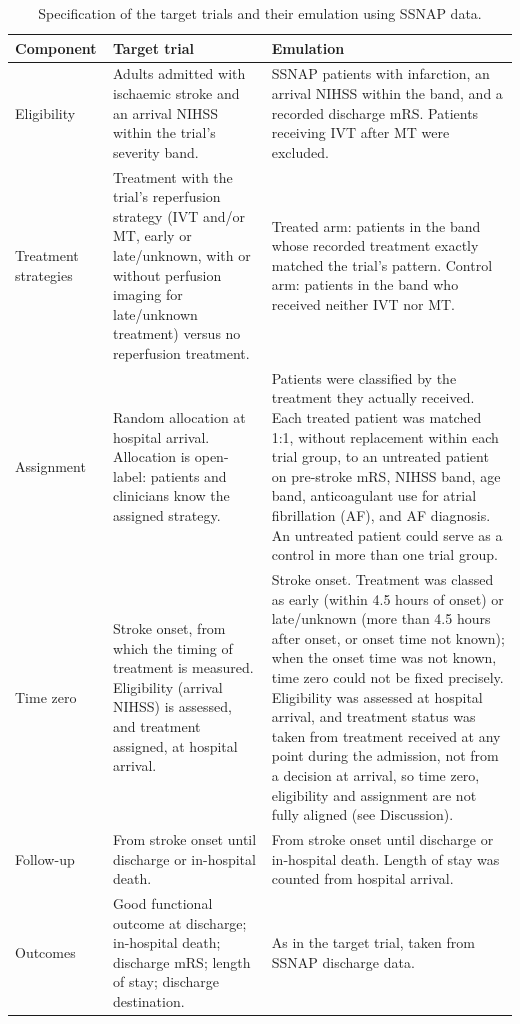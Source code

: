 \begin{table}[H]
\centering
\small
\caption{Specification of the target trials and their emulation using SSNAP data.}
\label{tab:target_trial}
\begin{tabular}{p{2.8cm} p{6.6cm} p{6.6cm}}
\toprule
\textbf{Component} & \textbf{Target trial} & \textbf{Emulation} \\
\midrule
Eligibility & Adults admitted with ischaemic stroke and an arrival NIHSS within the trial's severity band. & SSNAP patients with infarction, an arrival NIHSS within the band, and a recorded discharge mRS. Patients receiving IVT after MT were excluded. \\
\addlinespace
Treatment strategies & Treatment with the trial's reperfusion strategy (IVT and/or MT, early or late/unknown, with or without perfusion imaging for late/unknown treatment) versus no reperfusion treatment. & Treated arm: patients in the band whose recorded treatment exactly matched the trial's pattern. Control arm: patients in the band who received neither IVT nor MT. \\
\addlinespace
Assignment & Random allocation at hospital arrival. Allocation is open-label: patients and clinicians know the assigned strategy. & Patients were classified by the treatment they actually received. Each treated patient was matched 1:1, without replacement within each trial group, to an untreated patient on pre-stroke mRS, NIHSS band, age band, anticoagulant use for atrial fibrillation (AF), and AF diagnosis. An untreated patient could serve as a control in more than one trial group. \\
\addlinespace
Time zero & Stroke onset, from which the timing of treatment is measured. Eligibility (arrival NIHSS) is assessed, and treatment assigned, at hospital arrival. & Stroke onset. Treatment was classed as early (within 4.5 hours of onset) or late/unknown (more than 4.5 hours after onset, or onset time not known); when the onset time was not known, time zero could not be fixed precisely. Eligibility was assessed at hospital arrival, and treatment status was taken from treatment received at any point during the admission, not from a decision at arrival, so time zero, eligibility and assignment are not fully aligned (see Discussion).\\
\addlinespace
Follow-up & From stroke onset until discharge or in-hospital death. & From stroke onset until discharge or in-hospital death. Length of stay was counted from hospital arrival. \\
\addlinespace
Outcomes & Good functional outcome at discharge; in-hospital death; discharge mRS; length of stay; discharge destination. & As in the target trial, taken from SSNAP discharge data. \\

\end{tabular}
\end{table}
